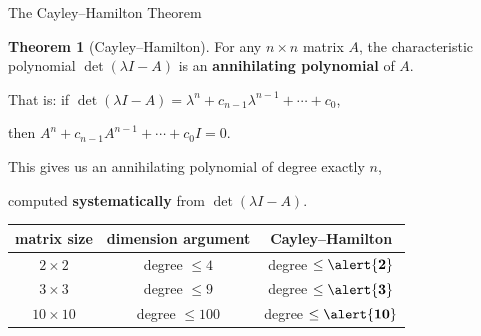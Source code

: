 \documentclass[10pt]{beamer}
\theoremstyle{definition}
\newtheorem{thm}{Theorem}[section]
\newcommand{\x}[1]{\alert{\textbf{#1}}}
\begin{document}
\begin{frame}{The Cayley--Hamilton Theorem}

\begin{thm}[Cayley--Hamilton]
For any $n \times n$ matrix $A$, the characteristic polynomial $\det(\lambda I - A)$
is an \x{annihilating polynomial} of $A$.

\medskip

That is: if $\det(\lambda I - A) = \lambda^n + c_{n-1}\lambda^{n-1} + \cdots + c_0$,

then $A^n + c_{n-1}A^{n-1} + \cdots + c_0 I = 0$.
\end{thm}

\vfill

This gives us an annihilating polynomial of degree exactly $n$,

computed \x{systematically} from $\det(\lambda I - A)$.

\vfill

\begin{center}
\renewcommand{\arraystretch}{1.4}
\begin{tabular}{c|c|c}
matrix size & dimension argument & Cayley--Hamilton \\
\hline
$2 \times 2$ & degree $\leq 4$ & degree $\leq \x{2}$ \\
$3 \times 3$ & degree $\leq 9$ & degree $\leq \x{3}$ \\
$10 \times 10$ & degree $\leq 100$ & degree $\leq \x{10}$
\end{tabular}
\end{center}

\vfill
\end{frame}
\end{document}
